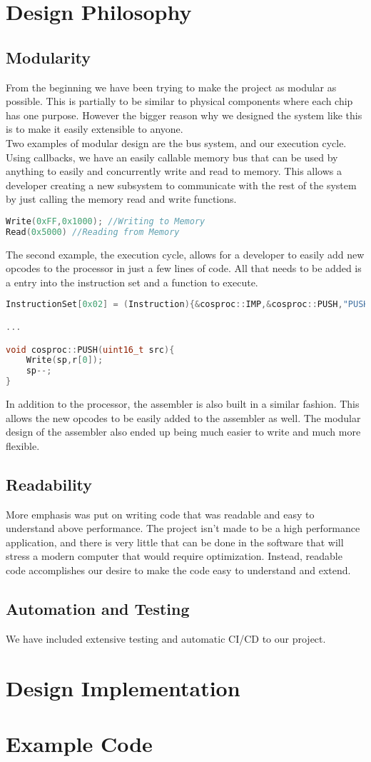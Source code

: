 \documentclass[conference]{IEEEtran}
\begin{document}
\section{Design Philosophy}
\subsection{Modularity}
From the beginning we have been trying to make the project as modular as possible. This is partially to be similar to physical components where each chip has one purpose. However the bigger reason why we designed the system like this is to make it easily extensible to anyone.\\ Two examples of modular design are the bus system, and our execution cycle. Using callbacks, we have an easily callable memory bus that can be used by anything to easily and concurrently write and read to memory. This allows a developer creating a new subsystem to communicate with the rest of the system by just calling the memory read and write functions. 

\begin{lstlisting}[language=C++, caption=Example of the Memory Bus being called]
Write(0xFF,0x1000); //Writing to Memory
Read(0x5000) //Reading from Memory
\end{lstlisting}

The second example, the execution cycle, allows for a developer to easily add new opcodes to the processor in just a few lines of code. All that needs to be added is a entry into the instruction set and a function to execute.
\begin{lstlisting}[language=C++, caption=Example of instruction set entry and function]
InstructionSet[0x02] = (Instruction){&cosproc::IMP,&cosproc::PUSH,"PUSH",1};

...

void cosproc::PUSH(uint16_t src){
	Write(sp,r[0]);
	sp--;
}
\end{lstlisting}
In addition to the processor, the assembler is also built in a similar fashion. This allows the new opcodes to be easily added to the assembler as well. The modular design of the assembler also ended up being much easier to write and much more flexible. 

\subsection{Readability}
More emphasis was put on writing code that was readable and easy to understand above performance. The project isn't made to be a high performance application, and there is very little that can be done in the software that will stress a modern computer that would require optimization. Instead, readable code accomplishes our desire to make the code easy to understand and extend.


\subsection{Automation and Testing}

We have included extensive testing and automatic CI/CD to our project. 


\section{Design Implementation}

\section{Example Code}
\end{document}
